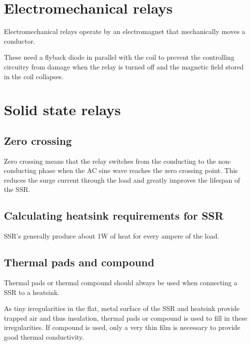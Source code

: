 \documentclass[11pt,fleqn]{book} %
\begin{document}
\section{Electromechanical relays}

Electromechanical relays operate by an electromagnet that mechanically moves a conductor.

These need a flyback diode in parallel with the coil to prevent the controlling circuitry from damage when the relay is turned off and the magnetic field stored in the coil collapses. 

\section{Solid state relays}

\subsection{Zero crossing}

Zero crossing means that the relay switches from the conducting to the non-conducting phase when the AC sine wave reaches the zero crossing point. This reduces the surge current through the load and greatly improves the lifespan of the SSR.

\subsection{Calculating heatsink requirements for SSR}

SSR's generally produce about 1W of heat for every ampere of the load.

\subsection{Thermal pads and compound}

Thermal pads or thermal compound should always be used when connecting a SSR to a heatsink.

As tiny irregularities in the flat, metal surface of the SSR and heatsink provide trapped air and thus insulation, thermal pads or compound is used to fill in these irregularities. If compound is used, only a very thin film is necessary to provide good thermal conductivity.


\end{document}
